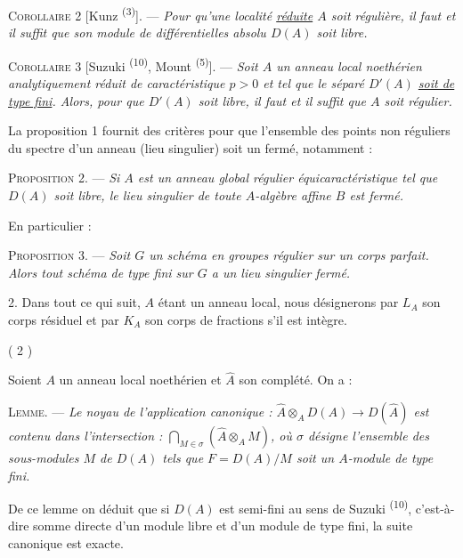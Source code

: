 \textsc{Corollaire 2} [Kunz \textsuperscript{(3)}]. --- \textit{Pour qu'une localité \uline{réduite} $A$ soit régulière, il faut et il suffit que son module de différentielles absolu $D(A)$ soit libre.}

\textsc{Corollaire 3} [Suzuki \textsuperscript{(10)}, Mount \textsuperscript{(5)}]. --- \textit{Soit $A$ un anneau local noethérien analytiquement réduit de caractéristique $p>0$ et tel que le séparé $D'(A)$ \uline{soit de type fini}. Alors, pour que $D'(A)$ soit libre, il faut et il suffit que $A$ soit régulier.}

La proposition 1 fournit des critères pour que l'ensemble des points non réguliers du spectre d'un anneau (lieu singulier) soit un fermé, notamment :

\textsc{Proposition 2.} --- \textit{Si $A$ est un anneau global régulier équicaractéristique tel que $D(A)$ soit libre, le lieu singulier de toute $A$-algèbre affine $B$ est fermé.}

En particulier :

\textsc{Proposition 3.} --- \textit{Soit $G$ un schéma en groupes régulier sur un corps parfait. Alors tout schéma de type fini sur $G$ a un lieu singulier fermé.}

2. Dans tout ce qui suit, $A$ étant un anneau local, nous désignerons par $L_A$ son corps résiduel et par $K_A$ son corps de fractions s'il est intègre.


\begin{center}( 2 )\end{center}

Soient $A$ un anneau local noethérien et $\widehat A$ son complété. On a :

\textsc{Lemme.} --- \textit{Le noyau de l'application canonique : $\widehat A\otimes_A D(A)\to D(\widehat A)$ est contenu dans l'intersection : $\displaystyle\bigcap_{M\in\sigma}\left(\widehat A\otimes_A M\right)$, où $\sigma$ désigne l'ensemble des sous-modules $M$ de $D(A)$ tels que $F=D(A)/M$ soit un $A$-module de type fini.}

De ce lemme on déduit que si $D(A)$ est semi-fini au sens de Suzuki \textsuperscript{(10)}, c'est-à-dire somme directe d'un module libre et d'un module de type fini, la suite canonique
est exacte.

